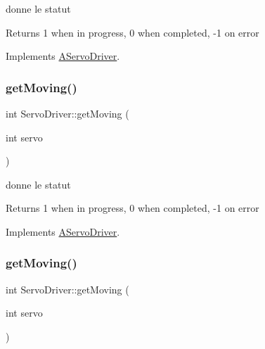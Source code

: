 donne le statut 

\begin{DoxyReturn}{Returns}
1 when in progress, 0 when completed, -\/1 on error 
\end{DoxyReturn}


Implements \hyperlink{classAServoDriver_a954ac7340407b997387d84d7059ed32b}{A\+Servo\+Driver}.

\mbox{\label{classServoDriver_a0a8e84f0bbcff39549ddfc239f1a6237}} 
\subsubsection{\texorpdfstring{get\+Moving()}{getMoving()}\hspace{0.1cm}{\footnotesize\ttfamily [4/6]}}
{\footnotesize\ttfamily int Servo\+Driver\+::get\+Moving (\begin{DoxyParamCaption}\item[{int}]{servo }\end{DoxyParamCaption})\hspace{0.3cm}{\ttfamily [virtual]}}



donne le statut 

\begin{DoxyReturn}{Returns}
1 when in progress, 0 when completed, -\/1 on error 
\end{DoxyReturn}


Implements \hyperlink{classAServoDriver_a954ac7340407b997387d84d7059ed32b}{A\+Servo\+Driver}.

\mbox{\label{classServoDriver_a0a8e84f0bbcff39549ddfc239f1a6237}} 
\subsubsection{\texorpdfstring{get\+Moving()}{getMoving()}\hspace{0.1cm}{\footnotesize\ttfamily [5/6]}}
{\footnotesize\ttfamily int Servo\+Driver\+::get\+Moving (\begin{DoxyParamCaption}\item[{int}]{servo }\end{DoxyParamCaption})\hspace{0.3cm}{\ttfamily [virtual]}}



